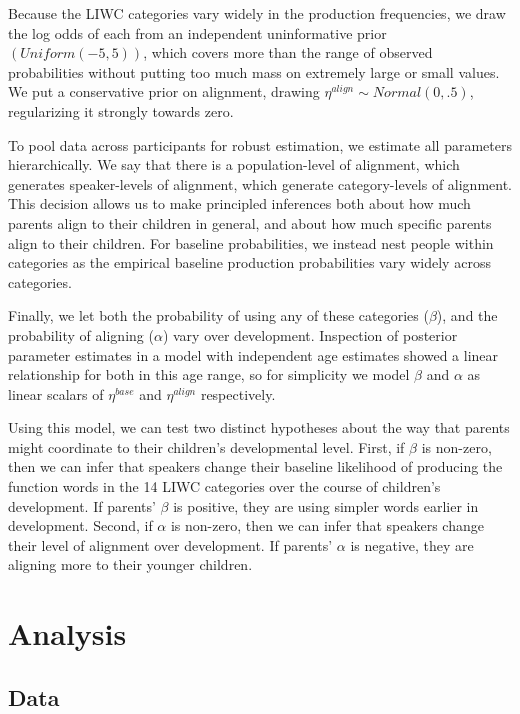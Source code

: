 \documentclass[10pt,letterpaper]{article}
\begin{document}
Because the LIWC categories vary widely in the production frequencies, we draw the log odds of each from an independent uninformative prior $\left(Uniform\left(-5,5\right)\right)$, which covers more than the range of observed probabilities without putting too much mass on extremely large or small values. We put a conservative prior on alignment, drawing $\eta^{align} \sim Normal(0,.5)$, regularizing it strongly towards zero.

To pool data across participants for robust estimation, we estimate all parameters hierarchically. We say that there is a population-level of alignment, which generates speaker-levels of alignment, which generate category-levels of alignment. This decision allows us to make principled inferences both about how much parents align to their children in general, and about how much specific parents align to their children. For baseline probabilities, we instead nest people within categories as the empirical baseline production probabilities vary widely across categories.

Finally, we let both the probability of using any of these categories ($\beta$), and the probability of aligning ($\alpha$) vary over development. Inspection of posterior parameter estimates in a model with independent age estimates showed a linear relationship for both in this age range, so for simplicity we model $\beta$ and $\alpha$ as linear scalars of $\eta^{base}$ and $\eta^{align}$ respectively.

Using this model, we can test two distinct hypotheses about the way that parents might coordinate to their children's developmental level. First, if $\beta$ is non-zero, then we can infer that speakers change their baseline likelihood of producing the function words in the 14 LIWC categories over the course of children's development. If parents' $\beta$ is positive, they are using simpler words earlier in development. Second, if $\alpha$ is non-zero, then we can infer that speakers change their level of alignment over development. If parents' $\alpha$ is negative, they are aligning more to their younger children.

\section{Analysis}

\subsection{Data}
\end{document}
